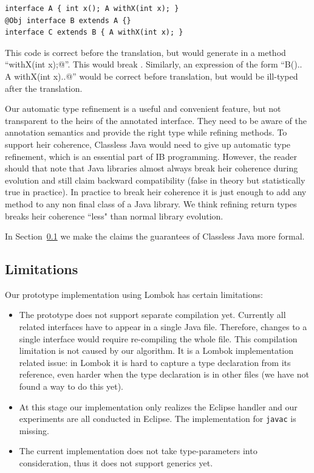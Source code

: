 \begin{lstlisting}
interface A { int x(); A withX(int x); }
@Obj interface B extends A {}
interface C extends B { A withX(int x); }
\end{lstlisting}

\noindent This code is correct before the translation, but \mixin would  generate in \Q@B@  a method ``\Q@B withX(int x);@''.
This would break \Q@C@.
Similarly, an expression of the form ``\Q@new B(){.. A withX(int x){..}}@''
would be correct before translation, but would be ill-typed after the translation.

Our automatic type refinement is a useful and convenient feature, but
not transparent to the heirs of the annotated interface.  They need to
be aware of the annotation semantics and provide the right type while
refining methods. To support heir coherence, Classless Java would need
to give up automatic type refinement, which is an essential part of IB programming.
However, the reader should that note that Java libraries almost always break heir
coherence during evolution and still claim backward compatibility (false in
theory but statistically true in practice). In practice to break heir
coherence it is just enough to add any method to any
non final class of a Java library.  We think refining return
types breaks heir coherence ``less" than normal library evolution.

In Section~\ref{} we make the claims the guarantees of Classless Java
more formal.

\subsection{Limitations}
Our prototype implementation using Lombok has certain limitations:
\begin{itemize}
\item The prototype does not support separate compilation yet. Currently all
  related interfaces have to appear in a single Java file. Therefore, changes to
  a single interface would require re-compiling the whole file. This compilation
  limitation is not caused by our algorithm. It is a Lombok implementation related
  issue: in Lombok it is hard to capture a type declaration from its reference,
  even harder when the type declaration is in other files (we have not found a
  way to do this yet).
\item At this stage our implementation only realizes the Eclipse handler and our
  experiments are all conducted in Eclipse. The implementation for
  \texttt{javac} is missing.
\item The current implementation does not take type-parameters into
  consideration, thus it does not support generics yet.
\end{itemize}

